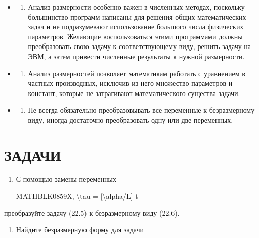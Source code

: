 \documentclass[
]{article}
\providecommand{\tightlist}{%
  \setlength{\itemsep}{0pt}\setlength{\parskip}{0pt}}
\begin{document}
{{\begin{itemize}
\tightlist
\item
  \begin{enumerate}
  \def\labelenumi{\arabic{enumi}.}
  \tightlist
  \item
    Анализ размерности особенно важен в численных методах, поскольку
    большинство программ написаны для решения общих математических задач
    и не подразумевают использование большого числа физических
    параметров. Желающие воспользоваться этими программами должны
    преобразовать свою задачу к соответствующему виду, решить задачу на
    ЭВМ, а затем привести численные результаты к нужной размерности.
  \end{enumerate}
\item
  \begin{enumerate}
  \def\labelenumi{\arabic{enumi}.}
  \setcounter{enumi}{1}
  \tightlist
  \item
    Анализ размерностей позволяет математикам работать с уравнением в
    частных производных, исключив из него множество параметров и
    констант, которые не затрагивают математического существа задачи.
  \end{enumerate}
\item
  \begin{enumerate}
  \def\labelenumi{\arabic{enumi}.}
  \setcounter{enumi}{2}
  \tightlist
  \item
    Не всегда обязательно преобразовывать все переменные к безразмерному
    виду, иногда достаточно преобразовать одну или две переменных.
  \end{enumerate}
\end{itemize}

\section{ЗАДАЧИ}\label{ux437ux430ux434ux430ux447ux438-6}

\begin{enumerate}
\def\labelenumi{\arabic{enumi}.}
\item
  С помощью замены переменных

  MATHBLK0859X, \textbackslash tau = {[}\textbackslash alpha/L{]} t
\end{enumerate}

преобразуйте задачу (22.5) к безразмерному виду (22.6).

\begin{enumerate}
\def\labelenumi{\arabic{enumi}.}
\setcounter{enumi}{1}
\tightlist
\item
  Найдите безразмерную форму для задачи
\end{enumerate}

}}
\end{document}
